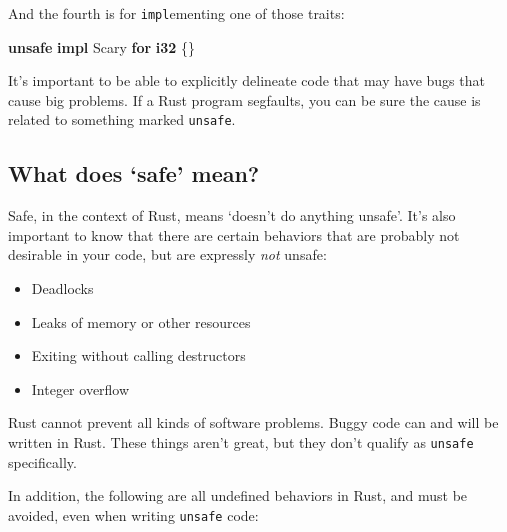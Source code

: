 \documentclass[a4paper,]{book}
\newenvironment{Shaded}{\begin{snugshade}}{\end{snugshade}}
\newcommand{\KeywordTok}[1]{\textcolor[rgb]{0.13,0.29,0.53}{\textbf{{#1}}}}
\newcommand{\NormalTok}[1]{{#1}}
\begin{document}
And the fourth is for \texttt{impl}ementing one of those traits:

\begin{Shaded}
\begin{Highlighting}[]
\KeywordTok{unsafe} \KeywordTok{impl} \NormalTok{Scary }\KeywordTok{for} \KeywordTok{i32} \NormalTok{\{\}}
\end{Highlighting}
\end{Shaded}

It's important to be able to explicitly delineate code that may have
bugs that cause big problems. If a Rust program segfaults, you can be
sure the cause is related to something marked \texttt{unsafe}.

\subsection{\texorpdfstring{What does `safe'
mean?}{What does safe mean?}}\label{what-does-safe-mean}

Safe, in the context of Rust, means `doesn't do anything unsafe'. It's
also important to know that there are certain behaviors that are
probably not desirable in your code, but are expressly \emph{not}
unsafe:

\begin{itemize}
\itemsep1pt\parskip0pt
\item
  Deadlocks
\item
  Leaks of memory or other resources
\item
  Exiting without calling destructors
\item
  Integer overflow
\end{itemize}

Rust cannot prevent all kinds of software problems. Buggy code can and
will be written in Rust. These things aren't great, but they don't
qualify as \texttt{unsafe} specifically.

In addition, the following are all undefined behaviors in Rust, and must
be avoided, even when writing \texttt{unsafe} code:
\end{document}
